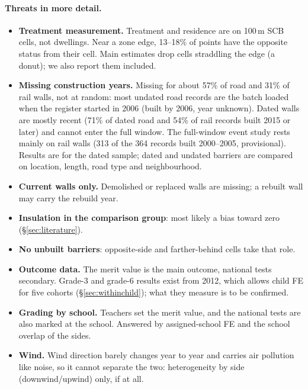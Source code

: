 \documentclass[11pt]{article}
\begin{document}
\paragraph{Threats in more detail.}
\begin{itemize}
\item \textbf{Treatment measurement.} Treatment and residence are on 100\,m SCB cells, not
  dwellings. Near a zone edge, 13--18\% of points have the opposite status from their cell. Main
  estimates drop cells straddling the edge (a donut); we also report them included.
\item \textbf{Missing construction years.} Missing for about 57\% of road and 31\% of rail walls,
  not at random: most undated road records are the batch loaded when the register started in
  2006 (built by 2006, year unknown). Dated walls are mostly recent (71\% of dated road and 54\%
  of rail records built 2015 or later) and cannot enter the full window. The full-window event
  study rests mainly on rail walls (313 of the 364 records built 2000--2005, provisional). Results are for the dated sample;
  dated and undated barriers are compared on location, length, road type and neighbourhood.
\item \textbf{Current walls only.} Demolished or replaced walls are missing; a rebuilt wall may
  carry the rebuild year.
\item \textbf{Insulation in the comparison group}: most likely a bias toward zero (\S\ref{sec:literature}).
\item \textbf{No unbuilt barriers}: opposite-side and farther-behind cells take that role.
\item \textbf{Outcome data.} The merit value is the main outcome, national tests secondary.
  Grade-3 and grade-6 results exist from 2012, which allows child FE for five cohorts
  (\S\ref{sec:withinchild}); what they measure is to be confirmed.
\item \textbf{Grading by school.} Teachers set the merit value, and the national tests are also
  marked at the school. Answered by assigned-school FE and the school overlap of the sides.
\item \textbf{Wind.} Wind direction barely changes year to year and carries air pollution like
  noise, so it cannot separate the two: heterogeneity by side (downwind/upwind) only, if at all.
\end{itemize}
\end{document}
